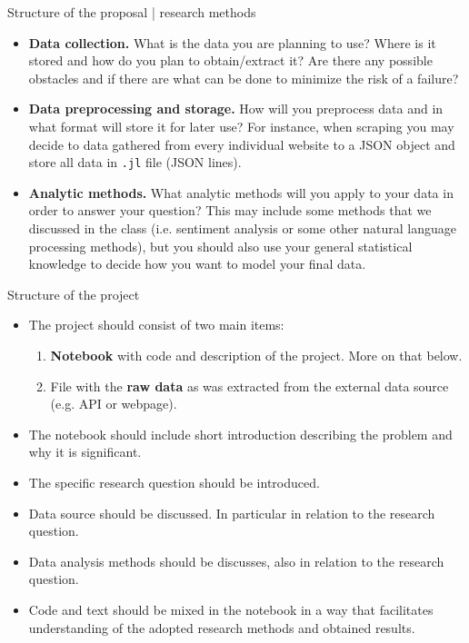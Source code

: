 \begin{frame}{Structure of the proposal | research methods}
\begin{itemize}
    \item \textbf{Data collection.} What is the data you are planning to use?
    Where is it stored and how do you plan to obtain/extract it?
    Are there any possible obstacles and if there are what can be done to
    minimize the risk of a failure?
    \item \textbf{Data preprocessing and storage.}
    How will you preprocess data and in what format will store it for later
    use? For instance, when scraping you may decide to data gathered from
    every individual website to a JSON object and store all data in
    \texttt{.jl} file (JSON lines).
    \item \textbf{Analytic methods.}
    What analytic methods will you apply to your data in order to answer
    your question? This may include some methods that we discussed in the class
    (i.e. sentiment analysis or some other natural language processing methods),
    but you should also use your general statistical knowledge to decide
    how you want to model your final data.
\end{itemize}
\end{frame}

\begin{frame}{Structure of the project}
\begin{itemize}
    \item The project should consist of two main items:
    \begin{enumerate}
        \item \textbf{Notebook} with code and description of the project.
        More on that below.
        \item File with the \textbf{raw data} as was extracted from
        the external data source (e.g. API or webpage).
    \end{enumerate}
    \item The notebook should include short introduction describing the
    problem and why it is significant.
    \item The specific research question should be introduced.
    \item Data source should be discussed. In particular in relation to
    the research question.
    \item Data analysis methods should be discusses, also in relation to the
    research question.
    \item Code and text should be mixed in the notebook in a way that
    facilitates understanding of the adopted research methods and obtained
    results.
\end{itemize}
\end{frame}

